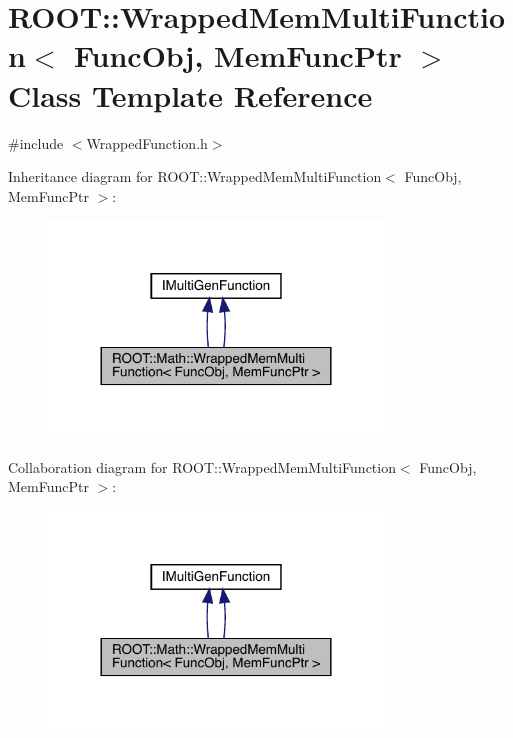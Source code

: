 \hypertarget{classROOT_1_1Math_1_1WrappedMemMultiFunction}{}\section{R\+O\+OT\+:\+:Wrapped\+Mem\+Multi\+Function$<$ Func\+Obj, Mem\+Func\+Ptr $>$ Class Template Reference}
\label{classROOT_1_1Math_1_1WrappedMemMultiFunction}


{\ttfamily \#include $<$Wrapped\+Function.\+h$>$}



Inheritance diagram for R\+O\+OT\+:\+:Wrapped\+Mem\+Multi\+Function$<$ Func\+Obj, Mem\+Func\+Ptr $>$\+:\nopagebreak
\begin{figure}[H]
\begin{center}
\leavevmode
\includegraphics[width=252pt]{d2/d09/classROOT_1_1Math_1_1WrappedMemMultiFunction__inherit__graph}
\end{center}
\end{figure}


Collaboration diagram for R\+O\+OT\+:\+:Wrapped\+Mem\+Multi\+Function$<$ Func\+Obj, Mem\+Func\+Ptr $>$\+:\nopagebreak
\begin{figure}[H]
\begin{center}
\leavevmode
\includegraphics[width=252pt]{d3/d6d/classROOT_1_1Math_1_1WrappedMemMultiFunction__coll__graph}
\end{center}
\end{figure}
